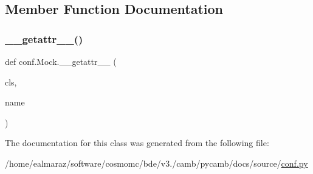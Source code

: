 \subsection{Member Function Documentation}
\mbox{\label{classconf_1_1Mock_a9f41a215ac97faa34862615516855b30}} 
\subsubsection{\texorpdfstring{\+\_\+\+\_\+getattr\+\_\+\+\_\+()}{\_\_getattr\_\_()}}
{\footnotesize\ttfamily def conf.\+Mock.\+\_\+\+\_\+getattr\+\_\+\+\_\+ (\begin{DoxyParamCaption}\item[{}]{cls,  }\item[{}]{name }\end{DoxyParamCaption})}



The documentation for this class was generated from the following file\+:\begin{DoxyCompactItemize}
\item 
/home/ealmaraz/software/cosmomc/bde/v3./camb/pycamb/docs/source/\mbox{\hyperlink{camb_2pycamb_2docs_2source_2conf_8py}{conf.\+py}}\end{DoxyCompactItemize}

